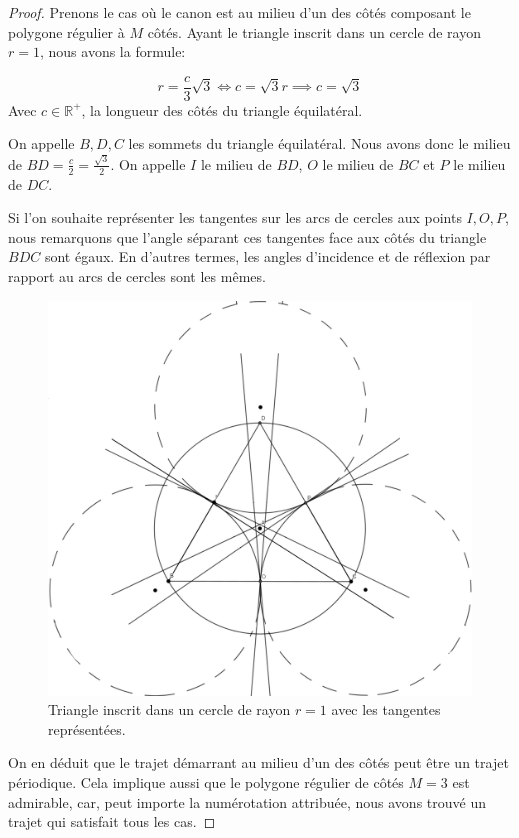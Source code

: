 \documentclass[a4paper]{amsart}
\theoremstyle{definition}
\theoremstyle{remark}
\numberwithin{equation}{section}
\begin{document}
\begin{proof}
    Prenons le cas où le canon est au milieu d'un des côtés composant le polygone régulier à $M$ côtés. Ayant le triangle inscrit dans un cercle de rayon $r=1$, nous avons la formule:

    \[r=\frac{c}{3}\sqrt{3} \Leftrightarrow c=\sqrt{3}r \implies c=\sqrt{3}\]
    Avec $c\in\mathbb{R^+}$, la longueur des côtés du triangle équilatéral.

    On appelle $B,D,C$ les sommets du triangle équilatéral. Nous avons donc le milieu de $BD=\frac{c}{2}=\frac{\sqrt{3}}{2}$. On appelle $I$ le milieu de $BD$, $O$ le milieu de $BC$ et $P$ le milieu de $DC$. 

    Si l'on souhaite représenter les tangentes sur les arcs de cercles aux points $I,O,P$, nous remarquons que l'angle séparant ces tangentes face aux côtés du triangle $BDC$ sont égaux. En d'autres termes, les angles d’incidence et de réflexion par rapport au arcs de cercles sont les mêmes.

    \begin{figure}[H]
      \centering
      \includegraphics[scale=0.15]{images/q5_tangentes.png}
      \caption{Triangle inscrit dans un cercle de rayon $r=1$ avec les tangentes représentées.}
  \end{figure}

  On en déduit que le trajet démarrant au milieu d'un des côtés peut être un trajet périodique. Cela implique aussi que le polygone 
  régulier de côtés $M=3$ est admirable, car, peut importe la numérotation attribuée, nous avons trouvé un trajet qui satisfait tous les cas.
\end{proof}
\end{document}
